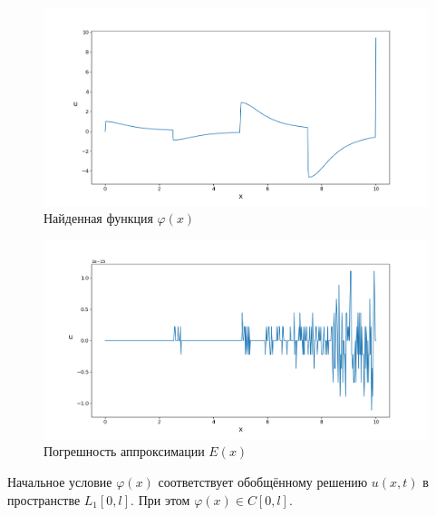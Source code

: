 \documentclass{article}
\theoremstyle{definition}
\begin{document}
\begin{figure}[H]
	\centering
	\includegraphics[trim={2.5cm, 0, 0, 1.5cm}, clip, scale=0.62]{2_u0.png}
	\caption{Найденная функция $\varphi(x)$}
	\label{fig:image5}
\end{figure}

\begin{figure}[H]
	\centering
	\includegraphics[trim={2.5cm, 0, 0, 1.5cm}, clip, scale=0.62]{2_E.png}
	\caption{Погрешность аппроксимации $E(x)$}
	\label{fig:image6}
\end{figure}

Начальное условие $\varphi(x)$ соответствует обобщённому решению $u(x,t)$ в пространстве $L_1[0,l]$. При этом
$\varphi(x) \in C[0,l]$.

\newpage	
\end{document}
